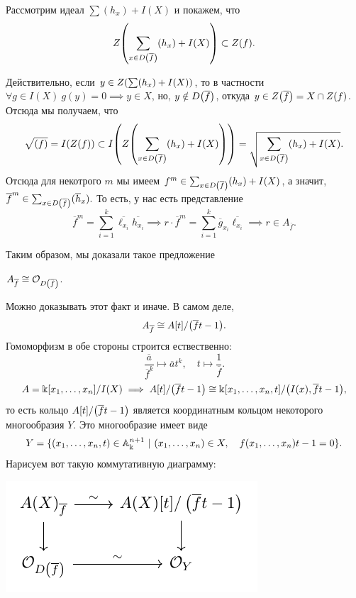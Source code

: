 	 Рассмотрим идеал $\sum (h_x) + I(X)$ и покажем, что 
	 \[
	   	Z\lr*{\sum_{x \in D\lr*{\overline{f}}} (h_x) + I(X)} \subset Z(f).
	   \]  

	   Действительно, если $y \in  Z\lr*{\sum (h_x) + I(X)}$, то в частности $\forall g \in I(X) \ g(y) = 0 \implies y \in X$, но, $y \notin D\lr*{\overline{f}}$, откуда $y \in Z\lr*{\overline{f}} = X \cap Z(f)$. Отсюда мы получаем, что 
	   \[
	   	\sqrt{(f)} = I\lr*{Z(f)} \subset I\lr*{Z\lr*{\sum_{x \in D\lr*{\overline{f}}} (h_x) + I(X)}} = \sqrt{\sum_{x \in D\lr*{\overline{f}}} (h_x) + I(X)}.
	   \]
	   Отсюда для некотрого $m$ мы имеем $f^m \in \sum_{x \in D\lr*{\overline{f}}} (h_x) + I(X)$, а значит, $\overline{f}^m \in \sum_{x \in D\lr*{\overline{f}}} (\overline{h}_x).$ То есть, у нас есть представление 
	   \[
	   	\overline{f}^m = \sum_{i = 1}^{k} \overline{\ell_{x_{i}}} \overline{h_{x_{i}}} \implies r \cdot \overline{f}^m  = \sum_{i = 1}^{k} \overline{g}_{x_{i}} \overline{\ell_{x_{i}}} \implies r \in A_{\overline{f}}. 
	   \]

	   Таким образом, мы доказали такое предложение 

	   \begin{statement} 
	   	$A_{\overline{f}} \cong \cO_{D\lr*{\overline{f}}}$.
	   \end{statement}

	   Можно доказывать этот факт и иначе. В самом деле, 
	   \[
	   		A_{\overline{f}} \cong A[t]/\lr*{\overline{f}t - 1}.
	   \]
	   Гомоморфизм в обе стороны строится ествественно:
	   \[
	    	\frac{\overline{a}}{\overline{f}^k} \mapsto \overline{a} t^k, \quad t \mapsto \frac{1}{\overline{f}}.
	    \] 
	   \[
	    	A = \Bbbk[x_1, \ldots, x_n]/I(X) \implies A[t]/\lr*{\overline{f}t - 1} \cong \Bbbk[x_1, \ldots, x_n, t]/\lr*{I(x), \overline{f}t - 1},
	    \] 
	    то есть кольцо $A[t]/\lr*{\overline{f}t - 1}$ является координатным кольцом некоторого многообразия $Y$. Это многообразие имеет виде 
	    \[
	    	Y = \{ (x_1, \ldots, x_n, t) \in \AA_{\Bbbk}^{n + 1} \ \vert \ (x_1, \ldots, x_n) \in X, \quad f(x_1, \ldots, x_n) t - 1 = 0 \}. 
	    \]
	    Нарисуем вот такую коммутативную диаграмму:
	    \begin{center}
	    	\includegraphics{lectures/5/pictures/pic_1.pdf}
	    \end{center}

